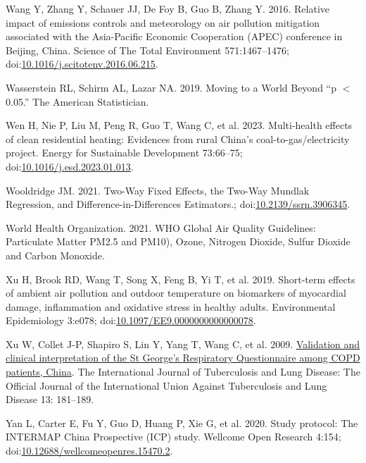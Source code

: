 \documentclass[
  letterpaper,
  DIV=11,
  numbers=noendperiod]{scrartcl}
\newlength{\cslhangindent}
\newenvironment{CSLReferences}[2] %
 {\begin{list}{}{%
  \setlength{\itemindent}{0pt}
  \setlength{\leftmargin}{0pt}
  \setlength{\parsep}{0pt}
  \ifodd #1
   \setlength{\leftmargin}{\cslhangindent}
   \setlength{\itemindent}{-1\cslhangindent}
  \fi
  \setlength{\itemsep}{#2\baselineskip}}}
 {\end{list}}
\begin{document}
\begin{CSLReferences}{1}{1}
Wang Y, Zhang Y, Schauer JJ, De Foy B, Guo B, Zhang Y. 2016. Relative
impact of emissions controls and meteorology on air pollution mitigation
associated with the {Asia-Pacific Economic Cooperation} ({APEC})
conference in {Beijing}, {China}. Science of The Total Environment
571:1467--1476;
doi:\href{https://doi.org/10.1016/j.scitotenv.2016.06.215}{10.1016/j.scitotenv.2016.06.215}.

Wasserstein RL, Schirm AL, Lazar NA. 2019. Moving to a {World Beyond}
{``p {\(<\)} 0.05.''} The American Statistician.

Wen H, Nie P, Liu M, Peng R, Guo T, Wang C, et al. 2023. Multi-health
effects of clean residential heating: {Evidences} from rural {China}'s
coal-to-gas/electricity project. Energy for Sustainable Development
73:66--75;
doi:\href{https://doi.org/10.1016/j.esd.2023.01.013}{10.1016/j.esd.2023.01.013}.

Wooldridge JM. 2021. Two-{Way Fixed Effects}, the {Two-Way Mundlak
Regression}, and {Difference-in-Differences Estimators}.;
doi:\href{https://doi.org/10.2139/ssrn.3906345}{10.2139/ssrn.3906345}.

World Health Organization. 2021. {WHO Global Air Quality Guidelines}:
{Particulate Matter PM2}.5 and {PM10}), {Ozone}, {Nitrogen Dioxide},
{Sulfur Dioxide} and {Carbon Monoxide}.

Xu H, Brook RD, Wang T, Song X, Feng B, Yi T, et al. 2019. Short-term
effects of ambient air pollution and outdoor temperature on biomarkers
of myocardial damage, inflammation and oxidative stress in healthy
adults. Environmental Epidemiology 3:e078;
doi:\href{https://doi.org/10.1097/EE9.0000000000000078}{10.1097/EE9.0000000000000078}.

Xu W, Collet J-P, Shapiro S, Lin Y, Yang T, Wang C, et al. 2009.
\href{https://www.ncbi.nlm.nih.gov/pubmed/19146745}{Validation and
clinical interpretation of the {St George}'s {Respiratory Questionnaire}
among {COPD} patients, {China}}. The International Journal of
Tuberculosis and Lung Disease: The Official Journal of the International
Union Against Tuberculosis and Lung Disease 13: 181--189.

Yan L, Carter E, Fu Y, Guo D, Huang P, Xie G, et al. 2020. Study
protocol: {The INTERMAP China Prospective} ({ICP}) study. Wellcome Open
Research 4:154;
doi:\href{https://doi.org/10.12688/wellcomeopenres.15470.2}{10.12688/wellcomeopenres.15470.2}.


\end{CSLReferences}
\end{document}
